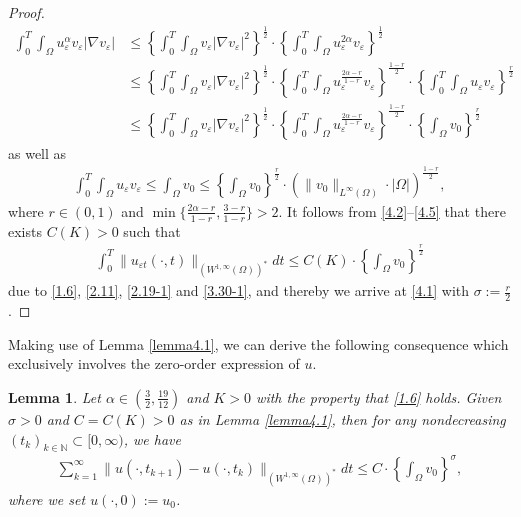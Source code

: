\documentclass[12pt]{article}
\theoremstyle{plain}
\newtheorem{lemma}{Lemma}[section]
\theoremstyle{definition}
\numberwithin{equation}{section}
\begin{document}
\begin{proof}
\begin{align}
     \int_0^{T}\int_{\Omega}u_{\varepsilon}^{\alpha}v_{\varepsilon}|\nabla v_{\varepsilon}|
     &\leq\left\{\int_0^{T}\int_{\Omega}v_{\varepsilon}|\nabla v_{\varepsilon}|^2\right\}^{\frac{1}{2}}\cdot \left\{\int_0^{T}\int_{\Omega}u_{\varepsilon}^{2\alpha}v_{\varepsilon} \right\}^{\frac{1}{2}}\nonumber\\
     &\leq\left\{\int_0^{T}\int_{\Omega}v_{\varepsilon}|\nabla v_{\varepsilon}|^2\right\}^{\frac{1}{2}}\cdot \left\{\int_0^{T}\int_{\Omega}u_{\varepsilon}^{\frac{2\alpha-r}{1-r}}v_{\varepsilon} \right\}^{\frac{1-r}{2}}\cdot \left\{\int_0^{T}\int_{\Omega}u_{\varepsilon}v_{\varepsilon} \right\}^{\frac{r}{2}}\nonumber\\
     &\leq\left\{\int_0^{T}\int_{\Omega}v_{\varepsilon}|\nabla v_{\varepsilon}|^2\right\}^{\frac{1}{2}}\cdot \left\{\int_0^{T}\int_{\Omega}u_{\varepsilon}^{\frac{2\alpha-r}{1-r}}v_{\varepsilon} \right\}^{\frac{1-r}{2}}\cdot \left\{\int_{\Omega}v_{0} \right\}^{\frac{r}{2}}
 \end{align}
 as well as
 \begin{align}\label{4.5}
    \int_0^{T}\int_{\Omega}u_{\varepsilon}v_{\varepsilon}\leq \int_{\Omega}v_{0}\leq\left\{\int_{\Omega}v_{0} \right\}^{\frac{r}{2}}\cdot\left(\|v_{0}\|_{L^{\infty}(\Omega)}\cdot|\Omega|\right)^{\frac{1-r}{2}},
 \end{align}
 where $r\in (0,1)$ and $\min\{\frac{2\alpha-r}{1-r},\frac{3-r}{1-r}\}>2$. It follows from \eqref{4.2}--\eqref{4.5} that there exists $C(K)>0$ such that
 \begin{align*}
      \int_0^T\|u_{\varepsilon t}(\cdot,t)\|_{(W^{1,\infty}(\Omega))^*}dt\leq C(K)\cdot\left\{\int_{\Omega}v_{0} \right\}^{\frac{r}{2}}
 \end{align*}
 due to \eqref{1.6}, \eqref{2.11}, \eqref{2.19-1} and \eqref{3.30-1}, and thereby we arrive at \eqref{4.1} with $\sigma:=\frac{r}{2}$.
\end{proof}
Making use of Lemma  \ref{lemma4.1}, we can derive the following consequence which  exclusively involves the zero-order expression of $u$. %
\begin{lemma}\label{lemma4.2}
Let $\alpha\in\left(\frac{3}{2},\frac{19}{12}\right)$ and $K>0$ with the property that \eqref{1.6} holds. Given
  $\sigma>0$ and $C=C(K)>0$ as in Lemma \ref{lemma4.1}, then for any nondecreasing $(t_{k})_{k\in \mathbb{N}}\subset [0,\infty)$, we have
\begin{align}\label{4.6}
   \sum_{k=1}^{\infty}\|u(\cdot,t_{k+1})-u(\cdot,t_{k})\|_{(W^{1,\infty}(\Omega))^*}dt\leq C\cdot \left\{\int_{\Omega} v_{0}\right\}^{\sigma},
\end{align}
where  we set $u(\cdot,0):=u_0$.
\end{lemma}
\end{document}
